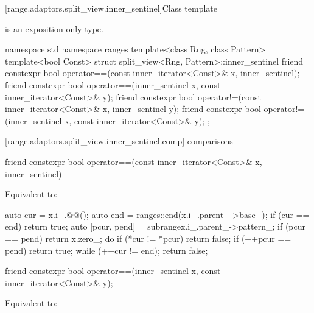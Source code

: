 {{\color{oldclr}
[range.adaptors.split_view.inner_sentinel]{Class template }

\pnum
\begin{note}
 is an exposition-only type.
\end{note}

\begin{codeblock}
namespace std { namespace ranges {
  template<class Rng, class Pattern>
  template<bool Const>
  struct split_view<Rng, Pattern>::inner_sentinel {
    friend constexpr bool operator==(const inner_iterator<Const>& x, inner_sentinel);
    friend constexpr bool operator==(inner_sentinel x, const inner_iterator<Const>& y);
    friend constexpr bool operator!=(const inner_iterator<Const>& x, inner_sentinel y);
    friend constexpr bool operator!=(inner_sentinel x, const inner_iterator<Const>& y);
  };
}}
\end{codeblock}

[range.adaptors.split_view.inner_sentinel.comp]{ comparisons}

%
\begin{itemdecl}
friend constexpr bool operator==(const inner_iterator<Const>& x, inner_sentinel)
\end{itemdecl}

\begin{itemdescr}
\pnum
\effects Equivalent to:
\begin{codeblock}
auto cur = x.i_.@@();
auto end = ranges::end(x.i_.parent_->base_);
if (cur == end) return true;
auto [pcur, pend] = subrange{x.i_.parent_->pattern_};
if (pcur == pend) return x.zero_;
do {
  if (*cur != *pcur) return false;
  if (++pcur == pend) return true;
} while (++cur != end);
return false;
\end{codeblock}
\end{itemdescr}

%
\begin{itemdecl}
friend constexpr bool operator==(inner_sentinel x, const inner_iterator<Const>& y);
\end{itemdecl}

\begin{itemdescr}
\pnum
\effects Equivalent to: 
\end{itemdescr}

}}
